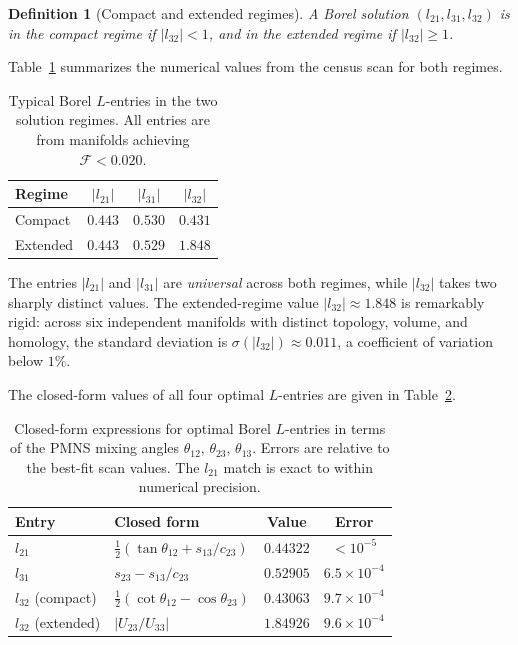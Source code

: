\documentclass[floatfix,aps,prd,twocolumn,showpacs,superscriptaddress,longbibliography]{revtex4-2}
\newtheorem{definition}{Definition}
\begin{document}
\begin{definition}[Compact and extended regimes]
\label{def:regimes}
A Borel solution $(l_{21}, l_{31}, l_{32})$ is in the
\emph{compact regime} if $|l_{32}| < 1$, and in the
\emph{extended regime} if $|l_{32}| \geq 1$.
\end{definition}
 
Table~\ref{tab:regimes} summarizes the numerical values from the
census scan for both regimes.
 
\begin{table}[h]
\centering
\caption{Typical Borel $L$-entries in the two solution regimes.
All entries are from manifolds achieving $\mathcal{F} < 0.020$.}
\label{tab:regimes}
\begin{tabular}{lccc}
\toprule
Regime & $|l_{21}|$ & $|l_{31}|$ & $|l_{32}|$ \\
\midrule
Compact  & $0.443$ & $0.530$ & $0.431$ \\
Extended & $0.443$ & $0.529$ & $1.848$ \\
\bottomrule
\end{tabular}
\end{table}
 
The entries $|l_{21}|$ and $|l_{31}|$ are \emph{universal} across
both regimes, while $|l_{32}|$ takes two sharply distinct values.
The extended-regime value $|l_{32}| \approx 1.848$ is remarkably
rigid: across six independent manifolds with distinct topology,
volume, and homology, the standard deviation is $\sigma(|l_{32}|)
\approx 0.011$, a coefficient of variation below $1\%$.
 
The closed-form values of all four optimal $L$-entries are
given in Table~\ref{tab:closed_form}.
 
\begin{table}[h]
\centering
\caption{Closed-form expressions for optimal Borel $L$-entries
in terms of the PMNS mixing angles
$\theta_{12}$, $\theta_{23}$, $\theta_{13}$.
Errors are relative to the best-fit scan values.
The $l_{21}$ match is exact to within numerical precision.}
\label{tab:closed_form}
\begin{tabular}{llcc}
\toprule
Entry & Closed form & Value & Error \\
\midrule
$l_{21}$          & $\tfrac{1}{2}(\tan\theta_{12} + s_{13}/c_{23})$
                  & $0.44322$ & $<10^{-5}$ \\
$l_{31}$          & $s_{23} - s_{13}/c_{23}$
                  & $0.52905$ & $6.5\times10^{-4}$ \\
$l_{32}$ (compact)  & $\tfrac{1}{2}(\cot\theta_{12} - \cos\theta_{23})$
                  & $0.43063$ & $9.7\times10^{-4}$ \\
$l_{32}$ (extended) & $|U_{23}/U_{33}|$
                  & $1.84926$ & $9.6\times10^{-4}$ \\
\bottomrule
\end{tabular}
\end{table}
 
\end{document}
